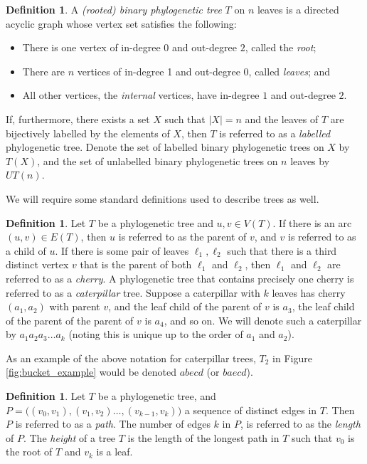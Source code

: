 \documentclass[12pt]{article}
\theoremstyle{definition}
\newtheorem{Definition}[Theorem]{Definition}
\begin{document}
\begin{Definition}
  A \emph{(rooted) binary phylogenetic tree} $T$ on $n$ leaves is a directed acyclic graph whose vertex set satisfies the following:
  \begin{itemize}
    \item There is one vertex of in-degree 0 and out-degree $2$, called the \emph{root};
    \item There are $n$ vertices of in-degree 1 and out-degree 0, called \emph{leaves}; and
    \item All other vertices, the \emph{internal} vertices, have in-degree  $1$ and out-degree $2$.
  \end{itemize}
  If, furthermore, there exists a set $X$ such that $|X|=n$ and the leaves of $T$ are bijectively labelled by the elements of $X$, then $T$ is referred to as a \emph{labelled} phylogenetic tree. Denote the set of labelled binary phylogenetic trees on $X$ by $T(X)$, and the set of unlabelled binary phylogenetic trees on $n$ leaves by $UT(n)$.
\end{Definition}

We will require some standard definitions used to describe trees as well.

\begin{Definition}
    Let $T$ be a phylogenetic tree and $u,v \in V(T)$. If there is an arc $(u,v) \in E(T)$, then $u$ is referred to as the parent of $v$, and $v$ is referred to as a child of $u$. If there is some pair of leaves $\ell_1,\ell_2$ such that there is a third distinct vertex $v$ that is the parent of both $\ell_1$ and $\ell_2$, then $\ell_1$ and $\ell_2$ are referred to as a \emph{cherry}. A phylogenetic tree that contains precisely one cherry is referred to as a \emph{caterpillar} tree. Suppose a caterpillar with $k$ leaves has cherry $(a_1,a_2)$ with parent $v$, and the leaf child of the parent of $v$ is $a_3$, the leaf child of the parent of the parent of $v$ is $a_4$, and so on. We will denote such a caterpillar by $a_1a_2a_3 \dots a_k$ (noting this is unique up to the order of $a_1$ and $a_2$).
\end{Definition}

 As an example of the above notation for caterpillar trees, $T_2$ in Figure \ref{fig:bucket_example} would be denoted $abecd$ (or $baecd$).

\begin{Definition}
    Let $T$ be a phylogenetic tree, and $P=\big((v_0,v_1),(v_1,v_2)\dots,(v_{k-1},v_k) \big)$ a sequence of distinct edges in $T$. Then $P$ is referred to as a \emph{path}. The number of edges $k$ in $P$, is referred to as the \emph{length} of $P$. The \emph{height} of a tree $T$ is the length of the longest path in $T$ such that $v_0$ is the root of $T$ and $v_k$ is a leaf. 
\end{Definition}
\end{document}
